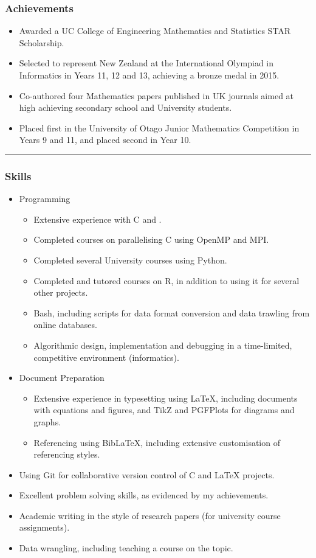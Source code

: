 \documentclass[a4paper,10pt]{article}
\begin{document}
\subsubsection*{Achievements}
\begin{itemize}
\item Awarded a UC College of Engineering Mathematics and Statistics STAR Scholarship.
\item Selected to represent New Zealand at the International Olympiad in Informatics in Years 11, 12 and 13, achieving a bronze medal in 2015. 
\item Co-authored four Mathematics papers published in UK journals aimed at high achieving secondary school and University students.
\item Placed first in the University of Otago Junior Mathematics Competition in Years 9 and 11, and placed second in Year 10.
\end{itemize}
\hrule

\subsubsection*{Skills}
\begin{itemize}
\item Programming
\begin{itemize}
\item Extensive experience with C and \cpluspluslogo.
\item Completed courses on parallelising C using OpenMP and MPI.
\item Completed several University courses using Python.
\item Completed and tutored courses on R, in addition to using it for several other projects.
\item Bash, including scripts for data format conversion and data trawling from online databases.
\item Algorithmic design, implementation and debugging in a time-limited, competitive environment (informatics).
\end{itemize}
\item Document Preparation
\begin{itemize}
\item Extensive experience in typesetting using LaTeX, including documents with equations and figures, and TikZ and PGFPlots for diagrams and graphs.
\item Referencing using BibLaTeX, including extensive customisation of referencing styles.
\end{itemize}
\item Using Git for collaborative version control of C and LaTeX projects.
\item Excellent problem solving skills, as evidenced by my achievements.
\item Academic writing in the style of research papers (for university course assignments).
\item Data wrangling, including teaching a course on the topic.
\end{itemize}
\end{document}
